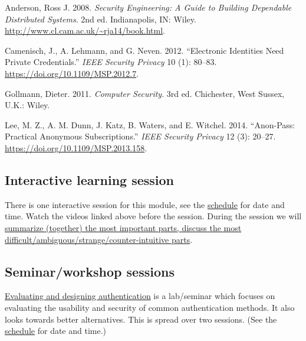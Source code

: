 \hypertarget{refs}{}
\leavevmode\hypertarget{ref-Anderson2008sea}{}%
Anderson, Ross J. 2008. \emph{Security Engineering: A Guide to Building
Dependable Distributed Systems}. 2nd ed. Indianapolis, IN: Wiley.
\url{http://www.cl.cam.ac.uk/~rja14/book.html}.

\leavevmode\hypertarget{ref-AnonymousCredentials}{}%
Camenisch, J., A. Lehmann, and G. Neven. 2012. ``Electronic Identities
Need Private Credentials.'' \emph{IEEE Security Privacy} 10 (1): 80--83.
\url{https://doi.org/10.1109/MSP.2012.7}.

\leavevmode\hypertarget{ref-Gollmann2011cs}{}%
Gollmann, Dieter. 2011. \emph{Computer Security}. 3rd ed. Chichester,
West Sussex, U.K.: Wiley.

\leavevmode\hypertarget{ref-AnonPass-magazine}{}%
Lee, M. Z., A. M. Dunn, J. Katz, B. Waters, and E. Witchel. 2014.
``Anon-Pass: Practical Anonymous Subscriptions.'' \emph{IEEE Security
Privacy} 12 (3): 20--27. \url{https://doi.org/10.1109/MSP.2013.158}.

\hypertarget{interactive-learning-session}{%
\subsection{Interactive learning
session}\label{interactive-learning-session}}

There is one interactive session for this module, see the
\href{https://portal.miun.se/web/student/schedule}{schedule} for date
and time. Watch the videos linked above before the session. During the
session we will
\href{https://ver.miun.se/courses/security/infosakc/auth-session.pdf}{summarize
(together) the most important parts, discuss the most
difficult/ambiguous/strange/counter-intuitive parts}.

\hypertarget{seminarworkshop-sessions}{%
\subsection{Seminar/workshop sessions}\label{seminarworkshop-sessions}}

\href{https://ver.miun.se/courses/security/infosakc/pwdeval.pdf}{Evaluating
and designing authentication} is a lab/seminar which focuses on
evaluating the usability and security of common authentication methods.
It also looks towards better alternatives. This is spread over two
sessions. (See the
\href{https://portal.miun.se/web/student/schedule}{schedule} for date
and time.)
